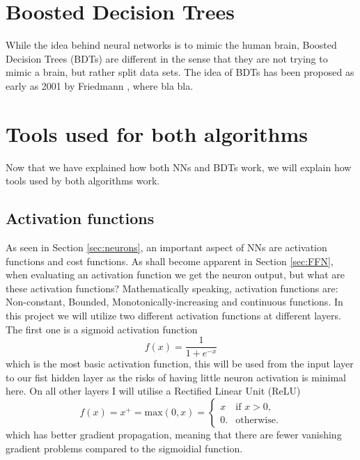 \documentclass[14pt, a4paper]{book}
\begin{document}
\clearpage




\section{Boosted Decision Trees}
While the idea behind neural networks is to mimic the human brain, Boosted Decision Trees (BDTs) are different in the sense that they are not trying to mimic a brain, but rather split data sets. The idea of BDTs has been proposed as early as 2001 by Friedmann \cite{BDT_Friedman}, 
where bla bla.

\clearpage
\section{Tools used for both algorithms}
Now that we have explained how both NNs and BDTs work, we will explain how tools used by both algorithms work. 
\subsection{Activation functions}\label{sec:act}
As seen in Section \ref{sec:neurons}, an important aspect of NNs are activation functions and cost functions. As shall become apparent in Section \ref{sec:FFN}, when evaluating an activation function we get the neuron output, but what are these activation functions? 
Mathematically speaking, activation functions are: Non-constant, Bounded, Monotonically-increasing and continuous functions. In this project we will utilize two different activation functions at different layers. 
The first one is a sigmoid activation function
\begin{equation}\label{eq:sig}
    f(x) = \frac{1}{1+e^{-x}}
\end{equation}
which is the most basic activation function, this will be used from the input layer to our fist hidden layer as the risks of having little neuron activation is minimal here. On all other layers I will utilise a Rectified Linear Unit (ReLU)
\begin{equation}\label{eq:ReLU}
    f(x) = x^+ = \text{max}(0,x) = \begin{cases}x&{\text{if }}x>0,\\0.&{\text{otherwise}}.\end{cases}
\end{equation}
which has better gradient propagation, meaning that there are fewer vanishing gradient problems compared to the sigmoidial function.
\end{document}
